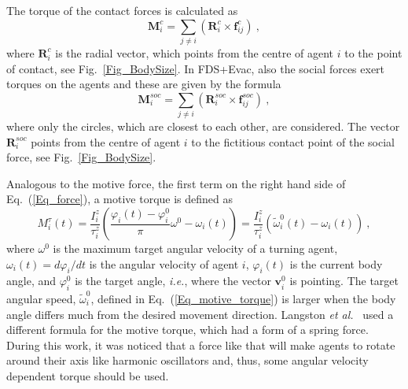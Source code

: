 \documentclass[12pt,a4paper,final,twoside]{stylevk}
\begin{document}
The torque of the contact forces is calculated as
%
\begin{equation}\label{Eq_fc_torque}
  \mathbf{M}^c_{i} = \sum_{j \ne i} \left( \mathbf{R}^c_{i} \times
  \mathbf{f}_{ij}^{c} \right) ~, 
\end{equation}
%
where $\mathbf{R}^c_{i}$ is the radial vector, which points from the
centre of agent $i$ to the point of contact, see
Fig.~\ref{Fig_BodySize}.  In FDS+Evac, also the social forces exert
torques on the agents and these are given by the formula
%
\begin{equation}\label{Eq_soc_torque}
  \mathbf{M}^{soc}_{i} =  \sum_{j \ne i} \left( \mathbf{R}^{soc}_{i}
  \times \mathbf{f}_{ij}^{soc} \right) ~,
\end{equation}
%
where only the circles, which are closest to each other, are
considered.  The vector $\mathbf{R}^{soc}_{i}$ points from the centre
of agent $i$ to the fictitious contact point of the social force, see
Fig.~\ref{Fig_BodySize}.


Analogous to the motive force, the first term on the right hand
side of Eq.~(\ref{Eq_force}), a motive torque is defined as
%
\begin{equation}\label{Eq_motive_torque}
  {M}^{\tau}_{i}  (t) = \frac{ I^z_{i} }{ \tau^z_{i} } \left(
  \frac{ \varphi_i(t) - \varphi^0_{i} }{\pi} \omega^0 - \omega_i(t)
  \right) = \frac{ I^z_{i} }{ \tau^z_{i} } \left( \tilde \omega^0_i
  (t) -  \omega_i (t) \right) ~, 
\end{equation}
%
where $\omega^0 $ is the maximum target angular velocity of a turning
agent, $\omega_i (t) = d\varphi_i/dt$ is the angular velocity of agent
$i$, $\varphi_i(t)$ is the current body angle, and $\varphi^0_{i}$ is
the target angle, \emph{i.e.}, where the vector $ \mathbf{v}_i^0 $ is
pointing.  The target angular speed, $\tilde \omega^0_i$, defined in
Eq.~(\ref{Eq_motive_torque}) is larger when the body angle differs
much from the desired movement direction.  Langston {\em et
  al.}~\cite{Langston06} used a different formula for the motive
torque, which had a form of a spring force.  During this work, it was
noticed that a force like that will make agents to rotate around their
axis like harmonic oscillators and, thus, some angular velocity
dependent torque should be used.
\end{document}
